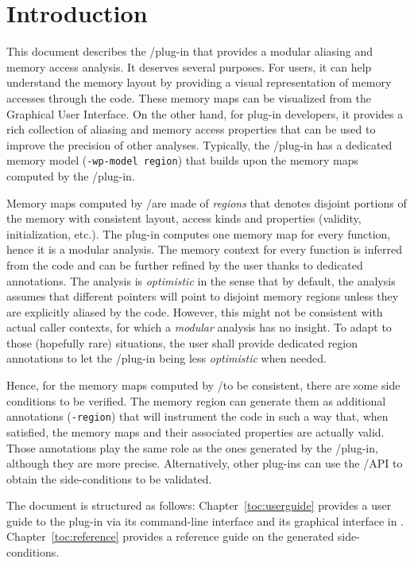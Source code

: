 \chapter*{Introduction}
\label{toc:introduction}

This document describes the \FramaC/\Region plug-in that provides a
modular aliasing and memory access analysis. It deserves several purposes. For
\FramaC users, it can help understand the memory layout by providing a visual
representation of memory accesses through the code. These memory maps can be
visualized from the \FramaC Graphical User Interface. On the other hand, for
\FramaC plug-in developers, it provides a rich collection of aliasing and memory
access properties that can be used to improve the precision of other analyses.
Typically, the \FramaC/\Wp plug-in has a dedicated memory model
(\verb$-wp-model region$) that builds upon the memory maps computed by the
\FramaC/\Region plug-in.

Memory maps computed by \FramaC/\Region are made of \emph{regions} that
denotes disjoint portions of the memory with consistent layout, access kinds and
properties (validity, initialization, etc.). The plug-in computes one memory map
for every function, hence it is a modular analysis. The memory context for every
function is inferred from the code and can be further refined by the user thanks
to dedicated \acsl annotations. The analysis is \emph{optimistic} in the sense
that by default, the analysis assumes that different pointers will point to
disjoint memory regions unless they are explicitly aliased by the code. However,
this might not be consistent with actual caller contexts, for which a
\emph{modular} analysis has no insight. To adapt to those (hopefully rare)
situations, the user shall provide dedicated region annotations to let the
\FramaC/\Region plug-in being less \emph{optimistic} when needed.

Hence, for the memory maps computed by \FramaC/\Region to be consistent,
there are some side conditions to be verified. The memory region can generate
them as additional \acsl annotations (\verb$-region$) that will instrument the
code in such a way that, when satisfied, the memory maps and their associated
properties are actually valid. Those annotations play the same role as the ones
generated by the \FramaC/\rte plug-in, although they are more precise.
Alternatively, other plug-ins can use the \FramaC/\Region API to obtain
the side-conditions to be validated.

The document is structured as follows: Chapter~\ref{toc:userguide} provides a
user guide to the \Region plug-in via its command-line interface and its
graphical interface in . Chapter~\ref{toc:reference} provides
a reference guide on the generated side-conditions.
